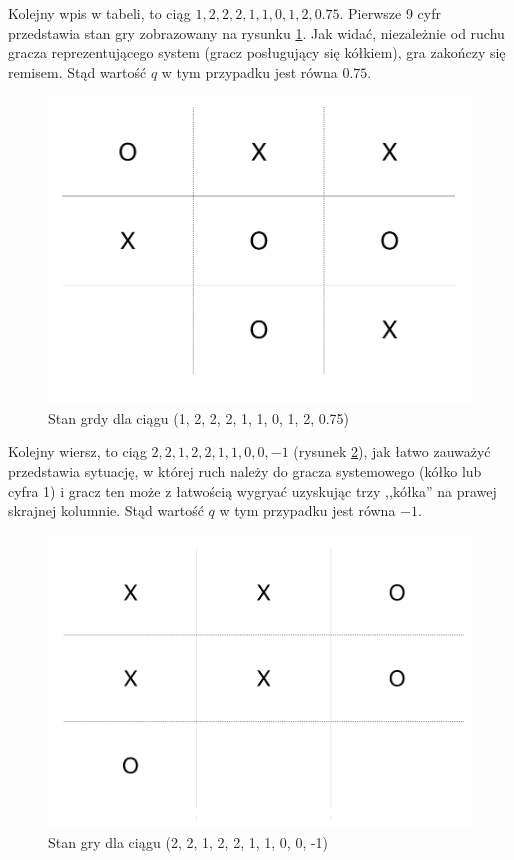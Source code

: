 \documentclass[licencjacka]{pracamgr}
\begin{document}
Kolejny wpis w tabeli, to ciąg $1, 2, 2, 2, 1, 1, 0, 1, 2, 0.75$. Pierwsze 9 cyfr przedstawia stan gry zobrazowany na rysunku \ref{Rys10}. Jak widać, niezależnie od ruchu gracza reprezentującego system (gracz posługujący się kółkiem), gra zakończy się remisem. Stąd wartość $q$ w tym przypadku jest równa $0.75$. \\

\begin{figure}[h!]
	\includegraphics [scale=0.22] {ttt_2.png}
	\caption{Stan grdy dla ciągu (1, 2, 2, 2, 1, 1, 0, 1, 2, 0.75)}
	\label{Rys10}
\end{figure}

Kolejny wiersz, to ciąg $2, 2, 1, 2,  2, 1, 1, 0, 0, -1$ (rysunek \ref{Rys11}), jak łatwo zauważyć przedstawia sytuację, w której  ruch należy do gracza systemowego (kółko lub cyfra 1) i gracz ten może z łatwością wygryać uzyskując trzy ,,kółka'' na prawej skrajnej kolumnie. Stąd wartość $q$ w tym przypadku jest równa $-1$.\\

\begin{figure}[H]
	\includegraphics [scale=0.22] {ttt_3.png}
	\caption{Stan gry dla ciągu (2, 2, 1, 2,  2, 1, 1, 0, 0, -1)}
	\label{Rys11}
\end{figure}
\end{document}
